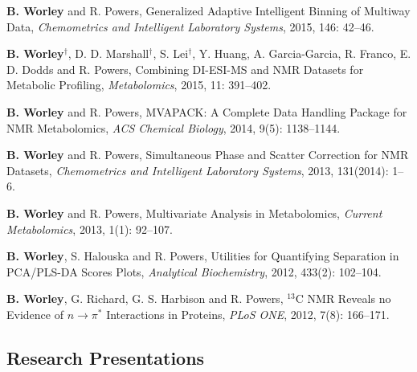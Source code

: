 \documentclass[letterpaper]{article}
\renewenvironment{itemize}{
  \begin{list}{}{
    \setlength{\leftmargin}{1.5em}
  }
}{
  \end{list}
}
\begin{document}
\begin{itemize}
 \item \textbf{B. Worley} and R. Powers,
  Generalized Adaptive Intelligent Binning of Multiway Data,
  \emph{Chemometrics and Intelligent Laboratory Systems},
  2015, 146: 42--46.

 \item \textbf{B. Worley}$^\dagger$, D. D. Marshall$^\dagger$,
  S. Lei$^\dagger$, Y. Huang, A. Garcia-Garcia, R. Franco,
  E. D. Dodds and R. Powers, Combining DI-ESI-MS and NMR Datasets for
  Metabolic Profiling,
  \emph{Metabolomics},
  2015, 11: 391--402.

 \item \textbf{B. Worley} and R. Powers,
  MVAPACK: A Complete Data Handling Package for NMR Metabolomics,
  \emph{ACS Chemical Biology},
  2014, 9(5): 1138--1144.

 \item \textbf{B. Worley} and R. Powers,
  Simultaneous Phase and Scatter Correction for NMR Datasets,
  \emph{Chemometrics and Intelligent Laboratory Systems},
  2013, 131(2014): 1--6.

 \item \textbf{B. Worley} and R. Powers,
  Multivariate Analysis in Metabolomics,
  \emph{Current Metabolomics},
  2013, 1(1): 92--107.

 \item \textbf{B. Worley}, S. Halouska and R. Powers,
  Utilities for Quantifying Separation in PCA/PLS-DA Scores Plots,
  \emph{Analytical Biochemistry},
  2012, 433(2): 102--104.

 \item \textbf{B. Worley}, G. Richard, G. S. Harbison and R. Powers,
  $^{13}$C NMR Reveals no Evidence of $n\rightarrow\pi^*$ Interactions
  in Proteins, \emph{PLoS ONE},
  2012, 7(8): 166--171.
\end{itemize}

\subsection*{Research Presentations}
\end{document}
